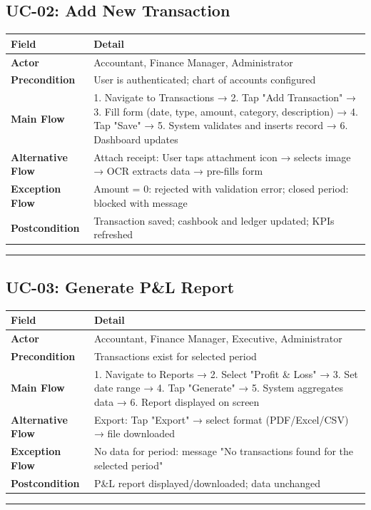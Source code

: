 \documentclass[journal, a4paper, onecolumn, 12pt]{IEEEtran}
\begin{document}
\subsection{UC-02: Add New Transaction}

\begin{longtable}{|p{}|p{}|}
\hline
Field & Detail \\ \hline
\hline
\textbf{Actor} & Accountant, Finance Manager, Administrator \\ \hline
\textbf{Precondition} & User is authenticated; chart of accounts configured \\ \hline
\textbf{Main Flow} & 1. Navigate to Transactions → 2. Tap "Add Transaction" → 3. Fill form (date, type, amount, category, description) → 4. Tap "Save" → 5. System validates and inserts record → 6. Dashboard updates \\ \hline
\textbf{Alternative Flow} & Attach receipt: User taps attachment icon → selects image → OCR extracts data → pre-fills form \\ \hline
\textbf{Exception Flow} & Amount = 0: rejected with validation error; closed period: blocked with message \\ \hline
\textbf{Postcondition} & Transaction saved; cashbook and ledger updated; KPIs refreshed \\ \hline
\end{longtable}
\vspace{1em}\hrule\vspace{1em}

\subsection{UC-03: Generate P\&L Report}

\begin{longtable}{|p{}|p{}|}
\hline
Field & Detail \\ \hline
\hline
\textbf{Actor} & Accountant, Finance Manager, Executive, Administrator \\ \hline
\textbf{Precondition} & Transactions exist for selected period \\ \hline
\textbf{Main Flow} & 1. Navigate to Reports → 2. Select "Profit \& Loss" → 3. Set date range → 4. Tap "Generate" → 5. System aggregates data → 6. Report displayed on screen \\ \hline
\textbf{Alternative Flow} & Export: Tap "Export" → select format (PDF/Excel/CSV) → file downloaded \\ \hline
\textbf{Exception Flow} & No data for period: message "No transactions found for the selected period" \\ \hline
\textbf{Postcondition} & P\&L report displayed/downloaded; data unchanged \\ \hline
\end{longtable}
\vspace{1em}\hrule\vspace{1em}
\end{document}
